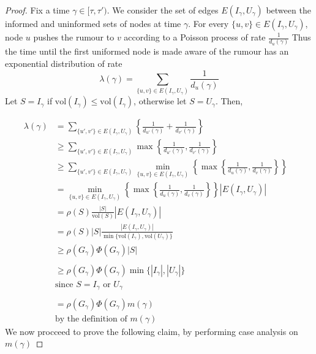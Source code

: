 \begin{proof}
	Fix a time $\gamma \in [\tau, \tau')$. 
	We consider the set of edges $E(I_\gamma, U_\gamma)$ between the informed and uninformed sets of nodes at time $\gamma$. 
	For every $\{u, v\} \in E(I_\gamma, U_\gamma)$, node $u$ pushes the rumour to $v$ according to a Poisson process of rate $\frac{1}{d_u(\gamma)}$ %
	Thus the time until the first uniformed node is made aware of the rumour has an exponential distribution of rate %
	$$
		\lambda(\gamma) = \sum_{\{u, v\} \in E(I_\gamma, U_\gamma)} \frac{1}{d_u(\gamma)}
	$$
	Let $S = I_\gamma$ if $\text{vol}(I_\gamma) \leq \text{vol}(I_\gamma)$, otherwise let $S = U_\gamma$. Then,

	\begin{align*}
		\lambda(\gamma) &= \sum_{\{u', v'\} \in E(I_\gamma, U_\gamma)} \left\{ \frac{1}{d_{u'}(\gamma)} + \frac{1}{d_{v'}(\gamma)} \right\}\\
		& \geq \sum_{\{u', v'\} \in E(I_\gamma, U_\gamma)}  \max \left\{ \frac{1}{d_{u'}(\gamma)},\frac{1}{d_{v'}(\gamma)} \right\} \\ 
		& \geq \sum_{\{u', v'\} \in E(I_\gamma, U_\gamma)} \min_{\{u, v\} \in E(I_\gamma, U_\gamma) } \left\{ \max \left\{ \frac{1}{d_u(\gamma)},\frac{1}{d_v(\gamma)} \right\} \right\} & \\ 
		& = \min_{\{u, v\} \in E(I_\gamma, U_\gamma) } 
		\left\{ \max \left\{ \frac{1}{d_u(\gamma)},\frac{1}{d_v(\gamma)} \right\} \right\} |E(I_\gamma, U_\gamma)| \\
		& = \rho(S) \frac{|S|}{\text{vol}(S)} |E(I_\gamma, U_\gamma)| \\
		& = \rho(S) |S| \frac{|E(I_\gamma, U_\gamma)|}{ 
			\min\{\text{vol}(I_\gamma), \text{vol}(U_\gamma)\}
		} \\
		& \geq \rho(G_\gamma)\Phi(G_\gamma)|S| \\ 
		& \\
		& \geq \rho(G_\gamma)\Phi(G_\gamma) \min\{|I_\gamma|, |U_\gamma|\} \\
		& \text{since } S = I_\gamma \text { or } U_\gamma \\
		& \\
		& = \rho(G_\gamma)\Phi(G_\gamma) m(\gamma) \\
		& \text{by the definition of } m(\gamma)
	\end{align*}
	We now procceed to prove the following claim, by performing case analysis on $m(\gamma)$


\end{proof}
